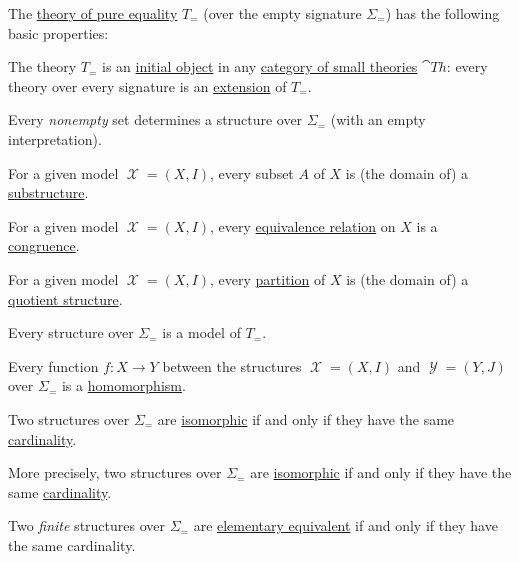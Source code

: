 \begin{proposition}\label{thm:def:pure_equality}
  The \hyperref[def:pure_equality]{theory of pure equality} \( T_= \) (over the empty signature \( \Sigma_= \)) has the following basic properties:
  \begin{thmenum}
     The theory \( T_= \) is an \hyperref[def:universal_objects/initial]{initial object} in any \hyperref[def:fol_theory/category]{category of small theories} \( \cat{Th} \): every theory over every signature is an \hyperref[def:fol_theory/extension]{extension} of \( T_= \).

     Every \emph{nonempty} set determines a structure over \( \Sigma_= \) (with an empty interpretation).

     For a given model \( \mscrX = (X, I) \), every subset \( A \) of \( X \) is (the domain of) a \hyperref[def:fol_substructure]{substructure}.

     For a given model \( \mscrX = (X, I) \), every \hyperref[def:equivalence_relation]{equivalence relation} on \( X \) is a \hyperref[def:fol_congruence]{congruence}.

     For a given model \( \mscrX = (X, I) \), every \hyperref[def:set_partition]{partition} of \( X \) is (the domain of) a \hyperref[def:fol_quotient_structure]{quotient structure}.

     Every structure over \( \Sigma_= \) is a model of \( T_= \).

     Every function \( f: X \to Y \) between the structures \( \mscrX = (X, I) \) and \( \mscrY = (Y, J) \) over \( \Sigma_= \) is a \hyperref[def:fol_homomorphism]{homomorphism}.

     Two structures over \( \Sigma_= \) are \hyperref[def:fol_isomorphism]{isomorphic} if and only if they have the same \hyperref[def:cardinality]{cardinality}.

    More precisely, two structures over \( \Sigma_= \) are \hyperref[def:fol_isomorphism]{isomorphic} if and only if they have the same \hyperref[def:cardinality]{cardinality}.

     Two \emph{finite} structures over \( \Sigma_= \) are \hyperref[def:elementary_equivalence]{elementary equivalent} if and only if they have the same cardinality.
  \end{thmenum}
\end{proposition}
